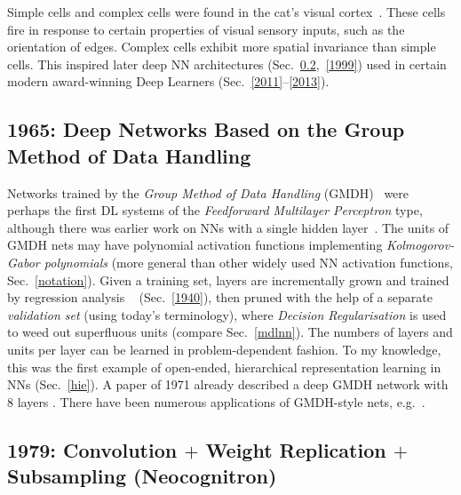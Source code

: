 \documentclass[letterpaper]{article}
\begin{document}
\begin{CJK*}{UTF8}{gbsn}
\begin{sloppypar}
Simple cells and complex cells were found in the cat's 
visual cortex~\citep[e.g.,][]{Hubel:62,wiesel:1959}.
These cells fire in response to certain properties of visual sensory inputs, 
such as the orientation of edges. Complex cells exhibit more spatial invariance than simple cells.
This  inspired later deep NN architectures 
(Sec.~\ref{1979},~\ref{1999}) used in certain modern award-winning Deep Learners (Sec.~\ref{2011}--\ref{2013}).



\subsection{1965: Deep Networks Based on the Group Method of Data Handling}
\label{1965}

Networks trained by the {\em Group Method of Data Handling} (GMDH)~\citep{ivakhnenko1965,ivakhnenko1967,ivakhnenko1968,ivakhnenko1971} 
were perhaps the first DL systems of
the {\em Feedforward Multilayer Perceptron} type,
although there was earlier work on NNs with a single hidden layer~\citep[e.g.,][]{joseph1961,viglione1970}.
The units of GMDH nets may have polynomial activation functions implementing 
{\em Kol\-mo\-go\-rov-Gabor polynomials} (more general than other widely used NN activation functions, Sec.~\ref{notation}).
Given a training set, layers are incrementally grown and trained by regression analysis ~\citep[e.g.,][]{legendre1805,gauss1809,gauss1821} (Sec.~\ref{1940}), 
then pruned with the help of a
separate {\em validation set} (using today's terminology), where
{\em Decision Regularisation} is used to weed out 
superfluous units (compare Sec.~\ref{mdlnn}). The numbers of layers and units per layer can be learned in
problem-dependent fashion.
To my knowledge, this was the first example of open-ended, hierarchical 
representation learning  in NNs (Sec.~\ref{hie}).
A paper of 1971 already described a deep GMDH network with 8 layers
\citep{ivakhnenko1971}.
There have been numerous applications of GMDH-style nets, e.g.~\citep{ikeda1976,farlow1984,madala1994,ivakhnenko1995,kondo1998,kordik2003,witczak2006,kondo2008}. 


\subsection{1979:  Convolution $+$ Weight Replication $+$ Subsampling (Neocognitron)}
\label{1979}


\end{sloppypar}
\end{CJK*}
\end{document}

